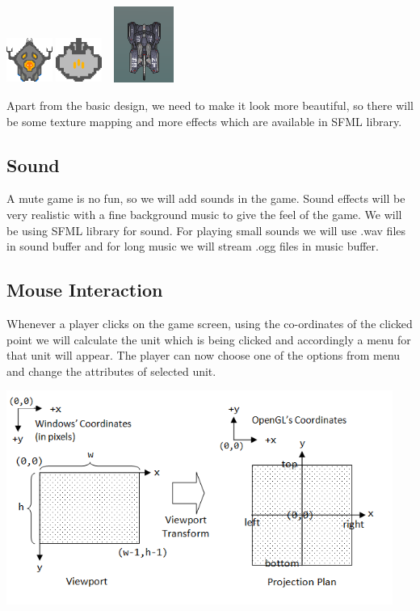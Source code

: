 \documentclass{article}
\begin{document}
\begin{center}
\includegraphics[width=1.5cm, height=1.5cm]{enemy.png}\hspace*{1cm}
\includegraphics[width=1.5cm, height=1.5cm]{towers.png}\hspace*{1cm}
\includegraphics[width=2.5cm, height=2.5cm]{Hero.png}
\end{center}
Apart from the basic design, we need to make it look more beautiful, so there will be some texture mapping and more effects which are available in SFML library.
\subsection{Sound}
A mute game is no fun, so we will add sounds in the game. Sound effects will be very realistic with a fine background music to give the feel of the game. We will be using SFML library for sound. For playing small sounds we will use .wav files in sound buffer and for long music we will stream .ogg files in music buffer.
\subsection{Mouse Interaction}
Whenever a player clicks on the game screen,  using the co-ordinates of the clicked point we will calculate the unit which is being clicked and accordingly a menu for that unit will appear. The player can now choose one of the options from menu and change the attributes of selected unit.
\begin{center}
\includegraphics[height=7.0cm]{mouse.png}
\end{center}
\newpage
\end{document}
